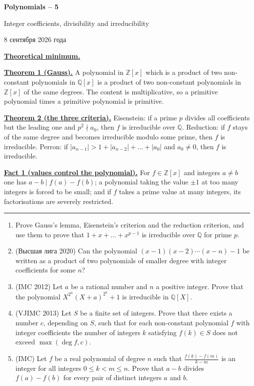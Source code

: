 \documentclass[11pt,a4paper]{article}
\renewcommand{\le}{\leqslant}
\newcommand{\head}[1]{\par\medskip\noindent\textbf{\underline{#1}}\quad}
\newcommand{\sheettitle}[4]{%
  \begin{center}
  {\huge\bfseries #1\par}\vspace{1.2em}
  {\Large #2\par}\vspace{0.8em}
  \if\relax\detokenize{#3}\relax\else{\Large #3\par}\vspace{0.8em}\fi
  {\foreignlanguage{russian}{#4}\par}
  \end{center}\vspace{0.5em}}
\begin{document}
\sheettitle{Polynomials -- 5}{Integer coefficients, divisibility and irreducibility}{}{8 сентября 2026 года}

\noindent\textbf{\underline{Theoretical minimum.}}\par

\medskip\head{Theorem 1 (Gauss).} A polynomial in $\mathbb Z[x]$ which is a product of two non-constant
polynomials in $\mathbb Q[x]$ is a product of two non-constant polynomials in $\mathbb Z[x]$ of the
same degrees. The content is multiplicative, so a primitive polynomial times a primitive
polynomial is primitive.

\medskip\head{Theorem 2 (the three criteria).} Eisenstein: if a prime $p$ divides all coefficients but the
leading one and $p^2\nmid a_0$, then $f$ is irreducible over $\mathbb Q$. Reduction: if $f$ stays of
the same degree and becomes irreducible modulo some prime, then $f$ is irreducible. Perron: if
$|a_{n-1}|>1+|a_{n-2}|+\dots+|a_0|$ and $a_0\ne0$, then $f$ is irreducible.

\medskip\head{Fact 1 (values control the polynomial).} For $f\in\mathbb Z[x]$ and integers $a\ne b$ one
has $a-b\mid f(a)-f(b)$; a polynomial taking the value $\pm1$ at too many integers is forced to be
small; and if $f$ takes a prime value at many integers, its factorisations are severely restricted.

\bigskip\noindent\rule{\linewidth}{0.4pt}

\begin{enumerate}[leftmargin=2.2em,itemsep=0.6em]
\item Prove Gauss's lemma, Eisenstein's criterion and the reduction criterion, and use them to
prove that $1+x+\dots+x^{p-1}$ is irreducible over $\mathbb Q$ for prime $p$.

\item (\foreignlanguage{russian}{Высшая лига} 2020) Can the polynomial $(x-1)(x-2)\cdots(x-n)-1$ be
written as a product of two polynomials of smaller degree with integer coefficients for some $n$?

\item (IMC 2012) Let $a$ be a rational number and $n$ a positive integer. Prove that the
polynomial $X^{2^n}(X+a)^{2^n}+1$ is irreducible in $\mathbb Q[X]$.

\pagebreak
\item (VJIMC 2013) Let $S$ be a finite set of integers. Prove that there exists a number $c$,
depending on $S$, such that for each non-constant polynomial $f$ with integer coefficients the
number of integers $k$ satisfying $f(k)\in S$ does not exceed $\max(\deg f,c)$.

\item (IMC) Let $f$ be a real polynomial of degree $n$ such that $\frac{f(k)-f(m)}{k-m}$ is an
integer for all integers $0\le k<m\le n$. Prove that $a-b$ divides $f(a)-f(b)$ for every pair of
distinct integers $a$ and $b$.
\end{enumerate}
\end{document}

